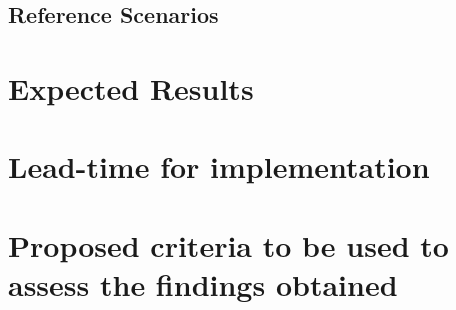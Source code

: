 \documentclass[12pt]{article}
\begin{document}
\subsection{Reference Scenarios}

\section{Expected Results}

\section{Lead-time for implementation}

\section{Proposed criteria to be used to assess the findings obtained}

\clearpage

\renewcommand{\refname}{References}



\end{document}
